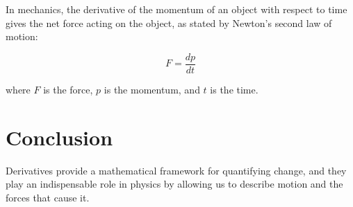 In mechanics, the derivative of the momentum of an object with respect to time gives the net force acting on the object, as stated by Newton's second law of motion:

\begin{equation}
F = \frac{dp}{dt}
\end{equation}

where $F$ is the force, $p$ is the momentum, and $t$ is the time.

\section{Conclusion}

Derivatives provide a mathematical framework for quantifying change, and they play an indispensable role in physics by allowing us to describe motion and the forces that cause it.

\